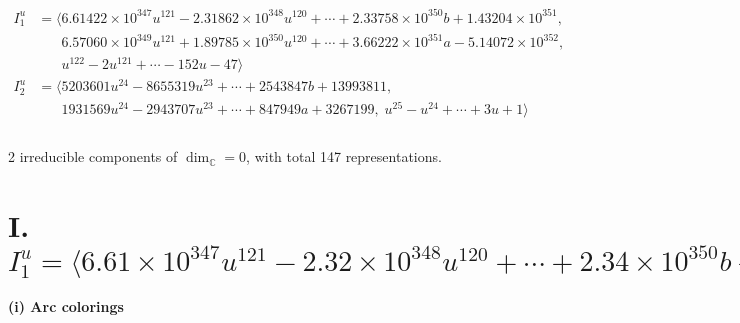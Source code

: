 \documentclass[1p]{elsarticle_modified}
\theoremstyle{definition}
\begin{document}
\begin{align*}
I^u_{1}&=\langle 
6.61422\times10^{347} u^{121}-2.31862\times10^{348} u^{120}+\cdots+2.33758\times10^{350} b+1.43204\times10^{351},\\
\phantom{I^u_{1}}&\phantom{= \langle  }6.57060\times10^{349} u^{121}+1.89785\times10^{350} u^{120}+\cdots+3.66222\times10^{351} a-5.14072\times10^{352},\\
\phantom{I^u_{1}}&\phantom{= \langle  }u^{122}-2 u^{121}+\cdots-152 u-47\rangle \\
I^u_{2}&=\langle 
5203601 u^{24}-8655319 u^{23}+\cdots+2543847 b+13993811,\\
\phantom{I^u_{2}}&\phantom{= \langle  }1931569 u^{24}-2943707 u^{23}+\cdots+847949 a+3267199,\;u^{25}- u^{24}+\cdots+3 u+1\rangle \\
\\
\end{align*}
\raggedright * 2 irreducible components of $\dim_{\mathbb{C}}=0$, with total 147 representations.\\
\newpage
\renewcommand{\arraystretch}{1}
\centering \section*{I. $I^u_{1}= \langle 6.61\times10^{347} u^{121}-2.32\times10^{348} u^{120}+\cdots+2.34\times10^{350} b+1.43\times10^{351},\;6.57\times10^{349} u^{121}+1.90\times10^{350} u^{120}+\cdots+3.66\times10^{351} a-5.14\times10^{352},\;u^{122}-2 u^{121}+\cdots-152 u-47 \rangle$}
\flushleft \textbf{(i) Arc colorings}\\
\end{document}
